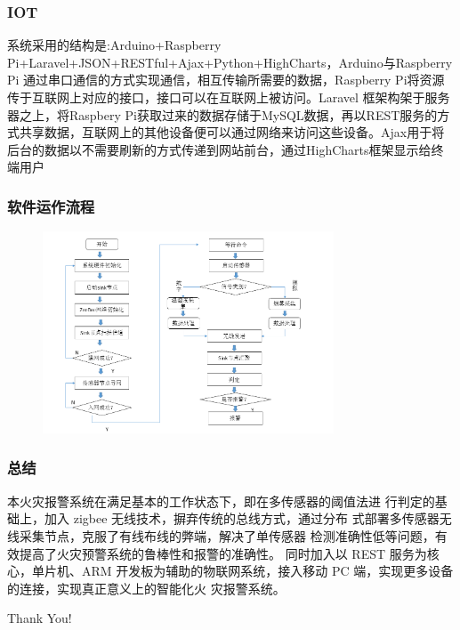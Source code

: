 ﻿\documentclass{beamer}
\begin{document}
\begin{frame}
\frametitle{IOT}
系统采用的结构是:Arduino+Raspberry Pi+Laravel+JSON+RESTful+Ajax+Python+HighCharts，Arduino与Raspberry Pi 通过串口通信的方式实现通信，相互传输所需要的数据，Raspberry Pi将资源传于互联网上对应的接口，接口可以在互联网上被访问。Laravel 框架构架于服务器之上，将Raspbery Pi获取过来的数据存储于MySQL数据，再以REST服务的方式共享数据，互联网上的其他设备便可以通过网络来访问这些设备。Ajax用于将后台的数据以不需要刷新的方式传递到网站前台，通过HighCharts框架显示给终端用户
\end{frame}
\begin{frame}
\frametitle{软件运作流程}
\begin{figure}
\centering
    \includegraphics[height=6cm]{./img/all}
\end{figure}
\end{frame}

\begin{frame}
\frametitle{总结}
本火灾报警系统在满足基本的工作状态下，即在多传感器的阈值法进
行判定的基础上，加入 zigbee 无线技术，摒弃传统的总线方式，通过分布
式部署多传感器无线采集节点，克服了有线布线的弊端，解决了单传感器
检测准确性低等问题，有效提高了火灾预警系统的鲁棒性和报警的准确性。
同时加入以 REST 服务为核心，单片机、ARM 开发板为辅助的物联网系统，接入移动 PC 端，实现更多设备的连接，实现真正意义上的智能化火
灾报警系统。
\end{frame}
\begin{frame}
Thank You!

\end{frame}

\end{document}
